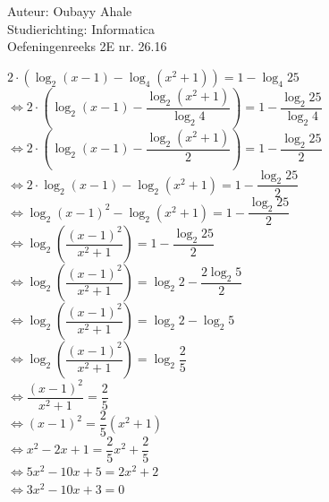 \documentclass[a4paper]{article}
\begin{document}
  
\noindent \large Auteur: Oubayy Ahale          \\
\noindent \large Studierichting: Informatica   \\
\noindent \large Oefeningenreeks 2E nr. 26.16  \\

\medskip

\normalsize

$ 2 \cdot (\log_2 (x-1) - \log_4 (x^2+1)) = 1 - \log_4 25 $\\

$ \Leftrightarrow 2 \cdot \left( \log_2 (x-1) - \dfrac{\log_2 (x^2+1)}{\log_2 4} \right) = 1 - \dfrac{\log_2 25}{\log_2 4} $\\

$ \Leftrightarrow 2 \cdot \left( \log_2 (x-1) - \dfrac{\log_2 (x^2+1)}{2} \right) = 1 - \dfrac{\log_2 25}{2} $\\

$ \Leftrightarrow 2 \cdot \log_2 (x-1) - \log_2 (x^2+1) = 1 - \dfrac{\log_2 25}{2} $\\

$ \Leftrightarrow \log_2 (x-1)^2 - \log_2 (x^2+1) = 1 - \dfrac{\log_2 25}{2} $\\

$ \Leftrightarrow \log_2 \left( \dfrac{(x-1)^2}{x^2+1} \right) = 1 - \dfrac{\log_2 25}{2} $\\

$ \Leftrightarrow \log_2 \left( \dfrac{(x-1)^2}{x^2+1} \right) = \log_2 2 - \dfrac{2 \log_2 5}{2} $\\

$ \Leftrightarrow \log_2 \left( \dfrac{(x-1)^2}{x^2+1} \right) = \log_2 2 - \log_2 5 $\\

$ \Leftrightarrow \log_2 \left( \dfrac{(x-1)^2}{x^2+1} \right) = \log_2 \dfrac{2}{5} $\\

$ \Leftrightarrow \dfrac{(x-1)^2}{x^2+1} = \dfrac{2}{5} $\\

$ \Leftrightarrow (x-1)^2 = \dfrac{2}{5} (x^2+1) $\\

$ \Leftrightarrow x^2 - 2x + 1 = \dfrac{2}{5} x^2 + \dfrac{2}{5} $\\

$ \Leftrightarrow 5x^2 - 10x + 5 = 2x^2 + 2 $\\

$ \Leftrightarrow 3x^2 - 10x + 3 = 0 $\\
\end{document}
